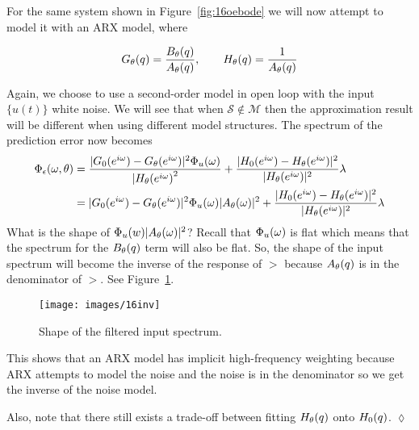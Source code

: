 \begin{example}
For the same system shown in Figure~\ref{fig:16oebode} we will now attempt to model it with an ARX model, where

\begin{equation*}
G_\theta(q)=\frac{B_\theta(q)}{A_\theta(q)}, \qquad H_\theta(q)=\frac{1}{A_\theta(q)}
\end{equation*}

Again, we choose to use a second-order model in open loop with the input $\{u(t)\}$ white noise.
We will see that when $\mathcal{S}\notin\mathcal{M}$ then the approximation result will be different when using different model structures.
The spectrum of the prediction error now becomes
\begin{align*}
\Phi_\epsilon(\omega,\theta) &= \frac{|G_0(e^{i\omega})-G_\theta(e^{i\omega})|^2\Phi_u(\omega)}{|H_\theta{(e^{i\omega})}^2} + \frac{|H_0(e^{i\omega})-H_\theta(e^{i\omega})|^2}{|H_\theta(e^{i\omega})|^2}\lambda \\
&= |G_0(e^{i\omega})-G_\theta(e^{i\omega})|^2\Phi_u(\omega)|A_\theta(\omega)|^2 + \frac{|H_0(e^{i\omega})-H_\theta(e^{i\omega})|^2}{|H_\theta(e^{i\omega})|^2}\lambda
\end{align*}
What is the shape of $\Phi_u(w)|A_\theta(\omega)|^2$? Recall that $\Phi_u(\omega)$ is flat which means that the spectrum for the $B_\theta(q)$ term will also be flat.
So, the shape of the input spectrum will become the inverse of the response of $\gt$ because $A_\theta(q)$ is in the denominator of $\gt$.
See Figure~\ref{fig:16inv}.

\begin{figure}[ht!]
\centering
\texttt{[image: images/16inv]}
\caption{Shape of the filtered input spectrum.}%
\label{fig:16inv}
\end{figure}

This shows that an ARX model has implicit high-frequency weighting because ARX attempts to model the noise and the noise is in the denominator so we get the inverse of the noise model.

Also, note that there still exists a trade-off between fitting $H_\theta(q)$ onto $H_0(q)$.
$\lozenge$
\end{example}

